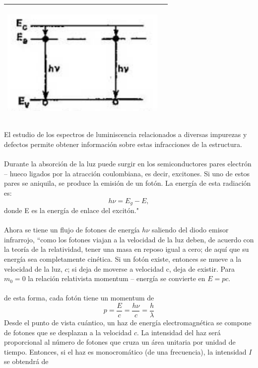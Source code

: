 \documentclass[12]{article}
\newenvironment{Figure}
{\par\medskip\noindent\minipage{\linewidth}}
{\endminipage\par\medskip}
\begin{document}
\begin{multicols}{2}
\begin{Figure}
\center
\begin{tabular}{|l|r|}
\hline
\includegraphics[width=8cm, height=6cm]{img/transiciones.png} \\ \hline
\end{tabular}
\label{fig:g1}
\end{Figure}
El estudio de los espectros de luminiscencia relacionados a diversas impurezas y defectos permite obtener información sobre estas infracciones de la estructura. \\ \\
Durante la absorción de la luz puede surgir en los semiconductores pares electrón – hueco ligados por la atracción coulombiana, es decir, excitones. Si uno de estos pares se aniquila, se produce la emisión de un fotón. La energía de esta radiación es: 
\begin{equation}
h\nu = E_g - E,
\end{equation}
donde E es la energía de enlace del excitón." \cite{SEMICONDUCTOR} \\ \\
Ahora se tiene un flujo de fotones de energía $h\nu$ saliendo del diodo emisor infrarrojo,  ``como los fotones viajan a la velocidad de la luz deben, de acuerdo con la teoría de la relatividad, tener una masa en reposo igual a cero; de aquí que su energía sea completamente cinética. Si un fotón existe, entonces se mueve a la velocidad de la luz, $c$; si deja de moverse a velocidad c, deja de existir. Para $m_{0} = 0$ la relación relativista momentum – energía  se convierte en $E = pc$. \\\\
de esta forma, cada fotón tiene un momentum de 
\begin{equation}
p = \frac{E}{c} = \frac{h\nu}{c} = \frac{h}{\lambda}
\end{equation}
Desde el punto de vista cuántico, un haz de energía electromagnética se compone de fotones que se desplazan a la velocidad $c$. La intensidad del haz será proporcional al número de fotones que cruza un área unitaria por unidad de tiempo. Entonces, si el haz es monocromático (de una frecuencia), la intensidad $I$ se obtendrá de 

\end{multicols}
\end{document}
